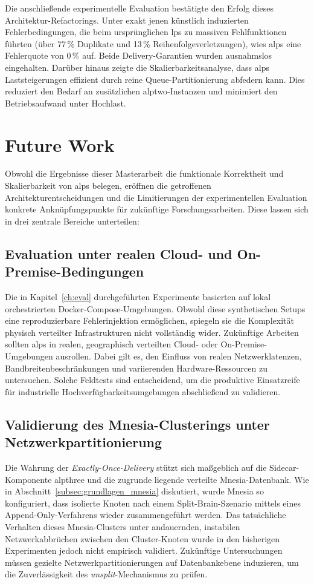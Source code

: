 Die anschließende experimentelle Evaluation bestätigte den Erfolg dieses Architektur-Refactorings. Unter exakt jenen künstlich induzierten Fehlerbedingungen, die beim ursprünglichen \gls{lps} zu massiven Fehlfunktionen führten (über 77\,\% Duplikate und 13\,\% Reihenfolgeverletzungen), wies \gls{alps} eine Fehlerquote von $0\,\%$ auf. Beide Delivery-Garantien wurden ausnahmslos eingehalten. Darüber hinaus zeigte die Skalierbarkeitsanalyse, dass \gls{alps} Laststeigerungen effizient durch reine Queue-Partitionierung abfedern kann. Dies reduziert den Bedarf an zusätzlichen \gls{alptwo}-Instanzen und minimiert den Betriebsaufwand unter Hochlast.

\chapter{Future Work}
\label{ch:future-work}

Obwohl die Ergebnisse dieser Masterarbeit die funktionale Korrektheit und Skalierbarkeit von \gls{alps} belegen, eröffnen die getroffenen Architekturentscheidungen und die Limitierungen der experimentellen Evaluation konkrete Anknüpfungspunkte für zukünftige Forschungsarbeiten. Diese lassen sich in drei zentrale Bereiche unterteilen:

\section{Evaluation unter realen Cloud- und On-Premise-Bedingungen}
Die in Kapitel~\ref{ch:eval} durchgeführten Experimente basierten auf lokal orchestrierten Docker-Compose-Umgebungen. Obwohl diese synthetischen Setups eine reproduzierbare Fehlerinjektion ermöglichen, spiegeln sie die Komplexität physisch verteilter Infrastrukturen nicht vollständig wider. Zukünftige Arbeiten sollten \gls{alps} in realen, geographisch verteilten Cloud- oder On-Premise-Umgebungen ausrollen. Dabei gilt es, den Einfluss von realen Netzwerklatenzen, Bandbreitenbeschränkungen und variierenden Hardware-Ressourcen  zu untersuchen. Solche Feldtests sind entscheidend, um die produktive Einsatzreife für industrielle Hochverfügbarkeitsumgebungen abschließend zu validieren.

\section{Validierung des Mnesia-Clusterings unter Netzwerkpartitionierung}
Die Wahrung der \textit{Exactly-Once-Delivery} stützt sich maßgeblich auf die Sidecar-Komponente \gls{alpthree} und die zugrunde liegende verteilte Mnesia-Datenbank. Wie in Abschnitt~\ref{subsec:grundlagen_mnesia} diskutiert, wurde Mnesia so konfiguriert, dass isolierte Knoten nach einem Split-Brain-Szenario mittels eines Append-Only-Verfahrens wieder zusammengeführt werden. Das tatsächliche Verhalten dieses Mnesia-Clusters unter andauernden, instabilen Netzwerkabbrüchen zwischen den Cluster-Knoten wurde in den bisherigen Experimenten jedoch nicht empirisch validiert. Zukünftige Untersuchungen müssen gezielte Netzwerkpartitionierungen auf Datenbankebene induzieren, um die Zuverlässigkeit des \textit{unsplit}-Mechanismus zu prüfen.

